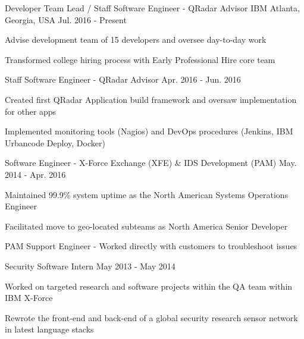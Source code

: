 
\begin{cventries}

  \cventry
    {Developer Team Lead / Staff Software Engineer - QRadar Advisor} %
    {IBM} %
    {Atlanta, Georgia, USA} %
    {Jul. 2016 - Present} %
    {
      \begin{cvitems}
        \item {Advise development team of 15 developers and oversee day-to-day work}
        \item {Transformed college hiring process with Early Professional Hire core team}
      \end{cvitems}
    }

  \cventry
    {Staff Software Engineer - QRadar Advisor}
    {}
    {}
    {Apr. 2016 - Jun. 2016}
    {
      \begin{cvitems}
        \item {Created first QRadar Application build framework and oversaw implementation for other apps}
        \item {Implemented monitoring tools (Nagios) and DevOps procedures (Jenkins, IBM Urbancode Deploy, Docker)}
      \end{cvitems}
    }

  \cventry
    {Software Engineer - X-Force Exchange (XFE) \& IDS Development (PAM)}
    {}
    {}
    {May. 2014 - Apr. 2016}
    {
    \begin{cvitems}
      \item {Maintained 99.9\% system uptime as the North American Systems Operations Engineer}
      \item {Facilitated move to geo-located subteams as North America Senior Developer}
      \item {PAM Support Engineer - Worked directly with customers to troubleshoot issues}
    \end{cvitems}
    }

  \cventry
    {Security Software Intern}
    {}
    {}
    {May 2013 - May 2014}
    {
    \begin{cvitems}
      \item {Worked on targeted research and software projects within the QA team within IBM X-Force}
      \item {Rewrote the front-end and back-end of a global security research sensor network in latest language stacks}
    \end{cvitems}
    }


\end{cventries}
